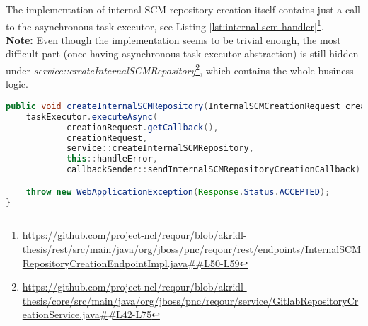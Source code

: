 \documentclass[../main.tex]{subfiles}
\begin{document}
The implementation of internal SCM repository creation itself contains just a call to the asynchronous task executor, see Listing \ref{lst:internal-scm-handler}\footnote{\url{https://github.com/project-ncl/reqour/blob/akridl-thesis/rest/src/main/java/org/jboss/pnc/reqour/rest/endpoints/InternalSCMRepositoryCreationEndpointImpl.java##L50-L59}}.\\
\textbf{Note:} Even though the implementation seems to be trivial enough, the most difficult part (once having asynchronous task executor abstraction) is still hidden under \textit{service::createInternalSCMRepository}\footnote{\url{https://github.com/project-ncl/reqour/blob/akridl-thesis/core/src/main/java/org/jboss/pnc/reqour/service/GitlabRepositoryCreationService.java##L42-L75}}, which contains the whole business logic.

\begin{lstlisting}[language=Java, caption=Internal SCM repository creation endpoint handler, label={lst:internal-scm-handler}]
public void createInternalSCMRepository(InternalSCMCreationRequest creationRequest) {
    taskExecutor.executeAsync(
            creationRequest.getCallback(),
            creationRequest,
            service::createInternalSCMRepository,
            this::handleError,
            callbackSender::sendInternalSCMRepositoryCreationCallback);

    throw new WebApplicationException(Response.Status.ACCEPTED);
}
\end{lstlisting}
\end{document}
